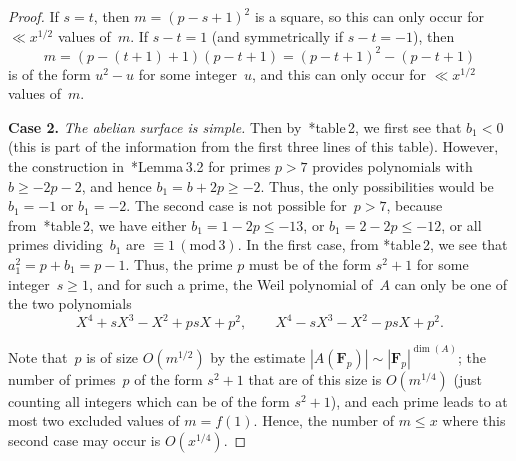 \documentclass[12pt]{amsart}
\renewcommand{\leq}{\leqslant}
\renewcommand{\geq}{\geqslant}
\numberwithin{equation}{section}
\newcommand{\Ff}{\mathbf{F}}
\newcommand{\mods}[1]{\,(\mathrm{mod}\,{#1})}
\theoremstyle{plain}
\theoremstyle{remark}
\theoremstyle{definition}
\renewcommand{\geq}{\geqslant}
\renewcommand{\leq}{\leqslant}
\begin{document}
\begin{proof}
  If $s=t$, then $m=(p-s+1)^2$ is a square, so this can only occur for
  $\ll x^{1/2}$ values of~$m$. If $s-t=1$ (and symmetrically if
  $s-t=-1$), then
  \[
    m=(p-(t+1)+1)(p-t+1)=(p-t+1)^2-(p-t+1)
  \]
  is of the form $u^2-u$ for some integer~$u$, and this can only occur
  for $\ll x^{1/2}$ values of~$m$.
  \par
  
  \textbf{Case 2.} \emph{The abelian surface is simple.}  Then
  by~\cite{hnr}*{table\,2}, we first see that $b_1<0$ (this is part of
  the information from the first three lines of this table).  However,
  the construction in~\cite{bhls}*{Lemma\,3.2} for primes $p>7$
  provides polynomials with $b\geq -2p-2$, and hence $b_1=b+2p\geq -2$. Thus, the only possibilities would be $b_1=-1$ or
  \hbox{$b_1=-2$}. The second case is not possible for~$p>7$, because
  from~\cite{hnr}*{table\,2}, we have either \hbox{$b_1=1-2p\leq -13$}, or
 \hbox{$b_1=2-2p\leq -12$}, or all primes dividing~$b_1$ are
  $\equiv 1\mods{3}$. In the first case, from \cite{hnr}*{table\,2},
  we see that $a_1^2=p+b_1=p-1$. Thus, the prime $p$ must be of the
  form $s^2+1$ for some integer~$s\geq 1$, and for such a prime, the
  Weil polynomial of~$A$ can only be one of the two polynomials
  \[
    X^4+sX^3-X^2+psX+p^2,\quad\quad X^4-sX^3-X^2-psX+p^2.
  \]

  Note that~$p$ is of size $O(m^{1/2})$ by the estimate $|A(\Ff_p)|\sim |\Ff_p|^{\dim(A)}$; the number of primes~$p$ of the
  form $s^2+1$ that are of this size is $O(m^{1/4})$ (just counting all
  integers which can be of the form $s^2+1$), and each prime leads to at
  most two excluded values of $m=f(1)$. Hence, the number of $m\leq x$
  where this second case may occur is $O(x^{1/4})$.
\end{proof}
\end{document}
